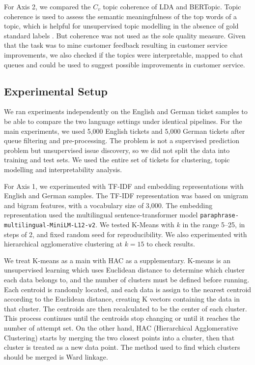 \documentclass[11pt]{article}
\begin{document}
For Axis 2, we compared the $C_v$ topic coherence of LDA and BERTopic. Topic coherence is used to assess the semantic meaningfulness of the top words of a topic, which is helpful for unsupervised topic modelling in the absence of gold standard labels \citep{roder2015exploring}. But coherence was not used as the sole quality measure. Given that the task was to mine customer feedback resulting in customer service improvements, we also checked if the topics were interpretable, mapped to chat queues and could be used to suggest possible improvements in customer service.

\subsection{Experimental Setup}

We ran experiments independently on the English and German ticket samples to be able to compare the two language settings under identical pipelines. For the main experiments, we used 5,000 English tickets and 5,000 German tickets after queue filtering and pre-processing. The problem is not a supervised prediction problem but unsupervised issue discovery, so we did not split the data into training and test sets. We used the entire set of tickets for clustering, topic modelling and interpretability analysis.

For Axis 1, we experimented with TF-IDF and embedding representations with English and German samples. The TF-IDF representation was based on unigram and bigram features, with a vocabulary size of 3,000. The embedding representation used the multilingual sentence-transformer model \texttt{paraphrase-multilingual-MiniLM-L12-v2}. We tested K-Means with $k$ in the range 5--25, in steps of 2, and fixed random seed for reproducibility. We also experimented with hierarchical agglomerative clustering at $k=15$ to check results.

We treat K-means as a main with HAC as a supplementary. K-means is an unsupervised learning which uses Euclidean distance to determine which cluster each data belongs to, and the number of clusters must be defined before running. Each centroid is randomly located, and each data is assign to the nearest centroid according to the Euclidean distance, creating K vectors containing the data in that cluster. The centroids are then recalculated to be the center of each cluster. This process continues until the centroids stop changing or until it reaches the number of attempt set. On the other hand, HAC (Hierarchical Agglomerative Clustering) starts by merging the two closest points into a cluster, then that cluster is treated as a new data point. The method used to find which clusters should be merged is Ward linkage.
\end{document}
